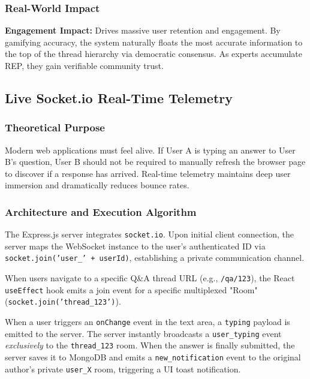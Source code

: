 \documentclass[12pt,a4paper]{article}
\begin{document}
\subsubsection{Real-World Impact}
\textbf{Engagement Impact:} Drives massive user retention and engagement. By gamifying accuracy, the system naturally floats the most accurate information to the top of the thread hierarchy via democratic consensus. As experts accumulate REP, they gain verifiable community trust.

\newpage

\subsection{Live Socket.io Real-Time Telemetry}

\subsubsection{Theoretical Purpose}
Modern web applications must feel alive. If User A is typing an answer to User B's question, User B should not be required to manually refresh the browser page to discover if a response has arrived. Real-time telemetry maintains deep user immersion and dramatically reduces bounce rates.

\subsubsection{Architecture and Execution Algorithm}
The Express.js server integrates \texttt{socket.io}. Upon initial client connection, the server maps the WebSocket instance to the user's authenticated ID via \texttt{socket.join('user\_' + userId)}, establishing a private communication channel.

When users navigate to a specific Q\&A thread URL (e.g., \texttt{/qa/123}), the React \texttt{useEffect} hook emits a join event for a specific multiplexed "Room" (\texttt{socket.join('thread\_123')}). 

When a user triggers an \texttt{onChange} event in the text area, a \texttt{typing} payload is emitted to the server. The server instantly broadcasts a \texttt{user\_typing} event \textit{exclusively} to the \texttt{thread\_123} room. When the answer is finally submitted, the server saves it to MongoDB and emits a \texttt{new\_notification} event to the original author's private \texttt{user\_X} room, triggering a UI toast notification.
\end{document}
